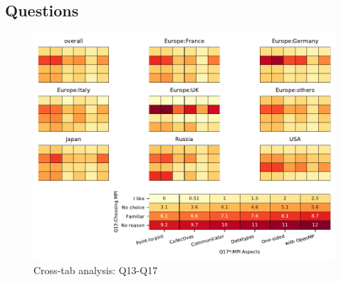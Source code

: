 
\subsection{Questions}


\begin{figure}
\begin{center}
\includegraphics[width=12cm]{../pdfs/Q13-Q17.pdf}
\caption{Cross-tab analysis: Q13-Q17}
\label{fig:Q13-Q17}
\end{center}
\end{figure}
